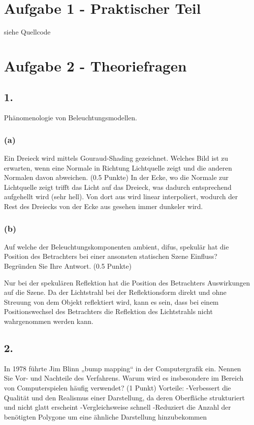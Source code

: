 \documentclass[12pt]{scrreprt}
\begin{document}


\chapter*{Aufgabe 1 - Praktischer Teil}

siehe Quellcode

\chapter*{Aufgabe 2 - Theoriefragen}
\section*{1.}
Phänomenologie von Beleuchtungsmodellen.
\subsection*{(a)}
Ein Dreieck wird mittels Gouraud-Shading gezeichnet. Welches Bild ist zu erwarten, wenn eine Normale in Richtung Lichtquelle zeigt und die anderen Normalen davon abweichen. (0.5 Punkte)
In der Ecke, wo die Normale zur Lichtquelle zeigt trifft das Licht auf das Dreieck, was dadurch entsprechend aufgehellt wird (sehr hell). Von dort aus wird linear interpoliert, wodurch der Rest des Dreiecks von der Ecke aus gesehen immer dunkeler wird.

\subsection*{(b)}
Auf welche der Beleuchtungskomponenten ambient, difus, spekulär hat die Position des Betrachters bei einer ansonsten statischen Szene Einﬂuss? Begründen Sie Ihre Antwort. (0.5 Punkte)

Nur bei der spekulären Reflektion hat die Position des Betrachters Auswirkungen auf die Szene. Da der Lichtstrahl bei der Reflektionsform direkt und ohne Streuung von dem Objekt reflektiert wird, kann es sein, dass bei einem Positionswechsel des Betrachters die Reflektion des Lichtstrahls nicht wahrgenommen werden kann.

\section*{2.}
In 1978 führte Jim Blinn „bump mapping“ in der Computergraﬁk ein. Nennen Sie Vor- und Nachteile des Verfahrens. Warum wird es insbesondere im Bereich von Computerspielen häuﬁg verwendet? (1 Punkt)
Vorteile:
-Verbessert die Qualität und den Realismus einer Darstellung, da deren Oberfläche strukturiert und nicht glatt erscheint
-Vergleichsweise schnell
-Reduziert die Anzahl der benötigten Polygone um eine ähnliche Darstellung hinzubekommen
\end{document}
